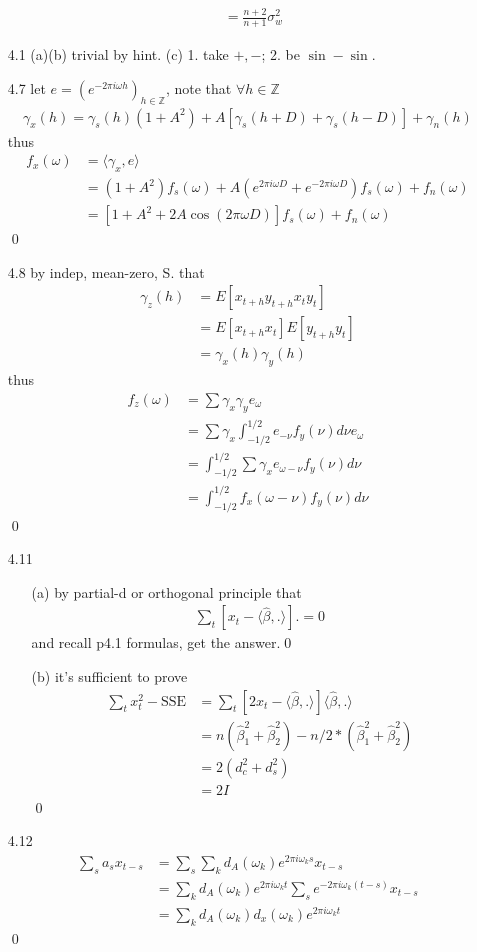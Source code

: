 \documentclass[paper=a4, fontsize=11pt]{scrartcl} %
\numberwithin{equation}{section} %
\numberwithin{figure}{section} %
\numberwithin{table}{section} %
\begin{document}
\begin{itemize}
\begin{align}
			&= \frac{n+2}{n+1}\sigma_w^2
	\end{align}
	\item[4.1](a)(b) trivial by hint. (c) 1. take $+,-$; 2. be $\sin -\sin$.
	\item[4.7] let $e = (e^{-2\pi i\omega h})_{h\in \mathbb{Z}}$, note that $\forall h\in \mathbb{Z}$
	\begin{align}
		\gamma_x(h) = \gamma_s(h)(1+A^2)+A[\gamma_s(h+D)+\gamma_s(h-D)] + \gamma_n(h)
	\end{align}
	thus
	\begin{align}
		f_x(\omega) &= \langle \gamma_x,e\rangle \\
			&= (1+A^2)f_s(\omega) + A(e^{2\pi i \omega D}+e^{-2\pi i \omega D})f_s(\omega) + f_n(\omega)\\
			&= [1+A^2+2A\cos(2\pi \omega D)]f_s(\omega)+ f_n(\omega)
	\end{align}\qed
	\item[4.8] by indep, mean-zero, S. that
	\begin{align}
		\gamma_z(h) &= E[x_{t+h}y_{t+h}x_t y_t] \\
			&= E[x_{t+h}x_t]E[y_{t+h}y_t]\\
			&= \gamma_x(h)\gamma_y(h)
	\end{align}
	thus
	\begin{align}
		f_z(\omega) &= \sum \gamma_x \gamma_y e_\omega\\
			&= \sum \gamma_x \int_{-1/2}^{1/2}e_{-\nu} f_y(\nu)d\nu  e_\omega\\
			&= \int_{-1/2}^{1/2}\sum \gamma_x e_{\omega-\nu} f_y(\nu)d\nu\\
			&= \int_{-1/2}^{1/2}f_x(\omega-\nu)f_y(\nu)d\nu
	\end{align}\qed
	\item[4.11]
	\begin{itemize}
		\item[(a)] by partial-d or orthogonal principle that
		\begin{align}
			\sum_t [x_t - \langle \widehat{\beta}, .\rangle].=0
		\end{align}
		and recall p4.1 formulas, get the answer.\qed
		\item[(b)] it's sufficient to prove
		\begin{align}
			\sum_t x_t^2 - \text{SSE} &= \sum_t [2x_t -\langle \widehat{\beta}, .\rangle] \langle \widehat{\beta}, .\rangle\\
				&= n(\widehat{\beta}_1^2 + \widehat{\beta}_2^2)- n/2 * (\widehat{\beta}_1^2 + \widehat{\beta}_2^2)\\
				&= 2 (d_c^2 + d_s^2)\\
				&= 2 I
		\end{align}\qed
	\end{itemize}
	\item[4.12]
	\begin{align}
		\sum_s a_s x_{t-s} &= \sum_s \sum_k d_A(\omega_k)e^{2\pi i\omega_k s} x_{t-s}\\
			&= \sum_k d_A(\omega_k)e^{2\pi i\omega_k t} \sum_s e^{-2\pi i\omega_k (t-s)}x_{t-s}\\
			&= \sum_k d_A(\omega_k)d_x(\omega_k) e^{2\pi i\omega_k t}
	\end{align}\qed
\end{itemize}
\end{document}
